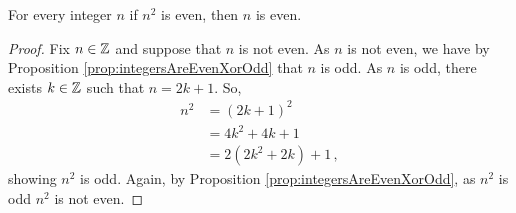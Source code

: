 \guard




\begin{lem}
\label{lem:IfSquareOfIntegerIsEvenThenEven}
  For every integer $n$ if $n^2$ is even, then $n$ is even.
\end{lem}
\begin{proof}
  Fix $n\in\mathbb{Z}$ and suppose that $n$ is not even.
  As $n$ is not even, we have by Proposition \ref{prop:integersAreEvenXorOdd} that $n$ is odd.
  As $n$ is odd, there exists $k\in\mathbb{Z}$ such that $n=2k+1$.
  So,
  \begin{align*}
    n^2 &= (2k+1)^2 \\
        &= 4k^2 + 4k + 1 \\
        &= 2(2k^2+2k) + 1\,,
  \end{align*}
  showing $n^2$ is odd.
  Again, by Proposition \ref{prop:integersAreEvenXorOdd}, as $n^2$ is odd $n^2$ is not even.
\end{proof}

